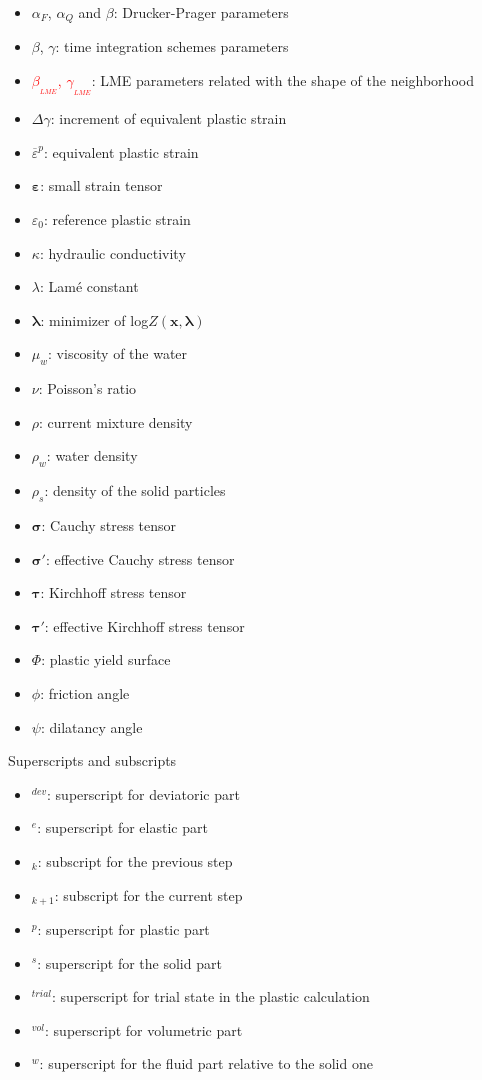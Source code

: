 \documentclass[twocolumn]{svjour3}          %
\begin{document}
\begin{itemize}
\item $\alpha_{F}$, $\alpha_{Q}$ and $\beta$: Drucker-Prager parameters
\item $\beta$, $\gamma$: time integration schemes parameters
\item \textcolor{red}{$\beta_{_{LME}}$, $\gamma_{_{LME}}$}: LME parameters related with the shape of the neighborhood
\item $\Delta\gamma$: increment of equivalent plastic strain
\item $\overline{\varepsilon}^p$: equivalent plastic strain
\item $\boldsymbol{\varepsilon}$: small strain tensor
\item  $\varepsilon_0$: reference plastic strain
\item $\kappa$: hydraulic conductivity
\item $\lambda$: Lam\'e constant
\item $\boldsymbol{\lambda}$: minimizer of log$Z(\boldsymbol{x},\boldsymbol{\lambda})$
\item  $\mu_w $: viscosity of the water
\item $\nu$: Poisson's ratio
\item $\rho$: current mixture density
\item $\rho_w$: water density
\item $\rho_s$: density of the solid particles
\item $\boldsymbol{\sigma}$: Cauchy stress tensor
\item $\boldsymbol{\sigma'}$: effective Cauchy stress tensor
\item $\boldsymbol{\tau}$: Kirchhoff stress tensor
\item $\boldsymbol{\tau'}$: effective Kirchhoff stress tensor
\item $\Phi$: plastic yield surface
\item  $\phi$: friction angle
\item $\psi$: dilatancy angle
\\
\end{itemize}

Superscripts and subscripts
\begin{itemize}
\item$^{dev}$: superscript for deviatoric part
\item$^{e}$: superscript for elastic part
\item$_{k}$: subscript for the previous step
\item$_{k+1}$: subscript for the current step
\item$^{p}$: superscript for plastic part
\item$^{s}$: superscript for the solid part
\item$^{trial}$: superscript for trial state in the plastic calculation
\item$^{vol}$: superscript for volumetric part
\item$^{w}$: superscript for the fluid part relative to the solid one
\end{itemize}
\end{document}
